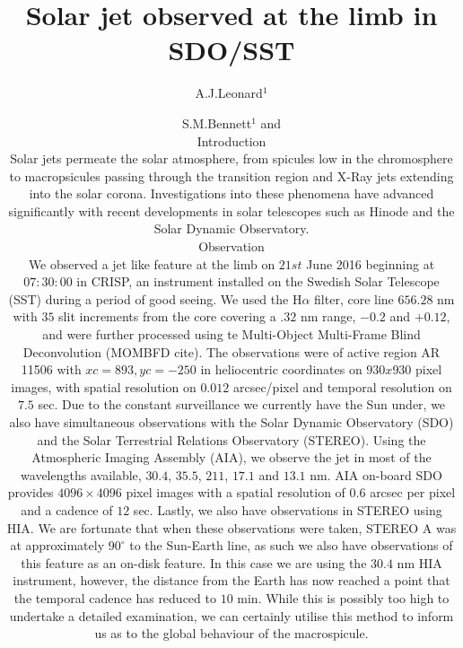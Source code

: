\documentclass{emulateapj}
\begin{document}
\title{Solar jet observed at the limb in SDO/SST}
\author{S.M.Bennett$^1$
and
\author{A.J.Leonard$^1$}


\begin{abstract}
\end{abstract}

\maketitle

\section{Introduction}
Solar jets permeate the solar atmosphere, from spicules low in the chromosphere to macropsicules passing through the transition region and X-Ray jets extending into the solar corona. Investigations into these phenomena have advanced significantly with recent developments in solar telescopes such as Hinode and the Solar Dynamic Observatory. 


\section{Observation}
We observed a jet like feature at the limb on $21st$ June 2016 beginning at $07:30:00$ in CRISP, an instrument installed on the Swedish Solar Telescope (SST) during a period of good seeing. %
We used the H$\alpha$ filter, core line $656.28$ nm with $35$ slit increments from the core covering a $.32$ nm range, $-0.2$ and $+0.12$, and were further processed using te Multi-Object Multi-Frame Blind Deconvolution (MOMBFD cite). %
The observations were of active region AR 11506 with $xc = 893, yc = -250$ in heliocentric coordinates on $930x930$ pixel images, with spatial resolution on $0.012$ arcsec/pixel and temporal resolution on $7.5$ sec.
Due to the constant surveillance we currently have the Sun under, we also have simultaneous observations with the Solar Dynamic Observatory (SDO) and the Solar Terrestrial Relations Observatory (STEREO).
Using the Atmospheric Imaging Assembly (AIA), we observe the jet in most of the wavelengths available, $30.4$, $35.5$, $211$, $17.1$ and $13.1$ nm.
AIA on-board SDO provides $4096 \times 4096$ pixel images with a spatial resolution of $0.6$ arcsec per pixel and a cadence of $12$ sec.
Lastly, we also have observations in STEREO using HIA. 
We are fortunate that when these observations were taken, STEREO A was at approximately $90^\circ$ to the Sun-Earth line, as such we also have observations of this feature as an on-disk feature. %
In this case we are using the $30.4$ nm HIA instrument, however, the distance from the Earth has now reached a point that the temporal cadence has reduced to $10$ min.
While this is possibly too high to undertake a detailed examination, we can certainly utilise this method to inform us as to the global behaviour of the macrospicule.   

}
\end{document}
